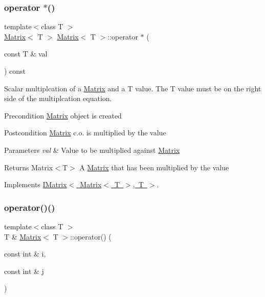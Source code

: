\subsubsection{\texorpdfstring{operator $\ast$()}{operator *()}}
{\footnotesize\ttfamily template$<$class T $>$ \\
\mbox{\hyperlink{class_matrix}{Matrix}}$<$ T $>$ \mbox{\hyperlink{class_matrix}{Matrix}}$<$ T $>$\+::operator $\ast$ (\begin{DoxyParamCaption}\item[{const T \&}]{val }\end{DoxyParamCaption}) const\hspace{0.3cm}{\ttfamily [virtual]}}



Scalar multiplcation of a \mbox{\hyperlink{class_matrix}{Matrix}} and a T value. The T value must be on the right side of the multiplcation equation. 

\begin{DoxyPrecond}{Precondition}
\mbox{\hyperlink{class_matrix}{Matrix}} object is created 
\end{DoxyPrecond}
\begin{DoxyPostcond}{Postcondition}
\mbox{\hyperlink{class_matrix}{Matrix}} c.\+o. is multiplied by the value 
\end{DoxyPostcond}

\begin{DoxyParams}{Parameters}
{\em val} & Value to be multiplied against \mbox{\hyperlink{class_matrix}{Matrix}} \\
\hline
\end{DoxyParams}
\begin{DoxyReturn}{Returns}
Matrix$<$\+T$>$ A \mbox{\hyperlink{class_matrix}{Matrix}} that has been multiplied by the value 
\end{DoxyReturn}


Implements \mbox{\hyperlink{class_i_matrix_a10121e038635bdf33552c6a1fb288398}{I\+Matrix$<$ Matrix$<$ T $>$, T $>$}}.

\mbox{\label{class_matrix_a685ee55a86c08533f9593247a6220a18}} 
\subsubsection{\texorpdfstring{operator()()}{operator()()}\hspace{0.1cm}{\footnotesize\ttfamily [1/2]}}
{\footnotesize\ttfamily template$<$class T $>$ \\
T \& \mbox{\hyperlink{class_matrix}{Matrix}}$<$ T $>$\+::operator() (\begin{DoxyParamCaption}\item[{const int \&}]{i,  }\item[{const int \&}]{j }\end{DoxyParamCaption})\hspace{0.3cm}{\ttfamily [virtual]}}



